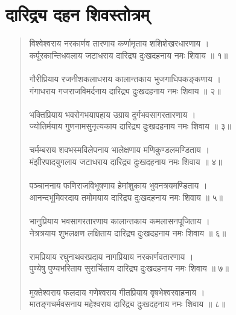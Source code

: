 \section{\sanskrit दारिद्र्य दहन शिवस्तोत्रम् }
\begin{quotation}\sanskrit
विश्वेश्वराय नरकार्णव तारणाय कर्णामृताय शशिशेखरधारणाय ।\\ 
कर्पूरकान्तिधवलाय जटाधराय दारिद्र्य दुःखदहनाय नमः शिवाय ॥ १॥\\ 
\\
गौरीप्रियाय रजनीशकलाधराय कालान्तकाय भुजगाधिपकङ्कणाय । \\
गंगाधराय गजराजविमर्दनाय दारिद्र्य दुःखदहनाय नमः शिवाय ॥ २॥ \\
\\
भक्तिप्रियाय भवरोगभयापहाय उग्राय दुर्गभवसागरतारणाय । \\
ज्योतिर्मयाय गुणनामसुनृत्यकाय दारिद्र्य दुःखदहनाय नमः शिवाय ॥ ३॥\\ 
\\
चर्मम्बराय शवभस्मविलेपनाय भालेक्षणाय मणिकुण्डलमण्डिताय । \\
मंझीरपादयुगलाय जटाधराय दारिद्र्य दुःखदहनाय नमः शिवाय ॥ ४॥ \\
\\
पञ्चाननाय फणिराजविभूषणाय हेमांशुकाय भुवनत्रयमण्डिताय । \\
आनन्दभूमिवरदाय तमोमयाय दारिद्र्य दुःखदहनाय नमः शिवाय ॥ ५॥\\ 
\\
भानुप्रियाय भवसागरतारणाय कालान्तकाय कमलासनपूजिताय । \\
नेत्रत्रयाय शुभलक्षण लक्षिताय दारिद्र्य दुःखदहनाय नमः शिवाय ॥ ६॥ \\
\\
रामप्रियाय रघुनाथवरप्रदाय नागप्रियाय नरकार्णवतारणाय । \\
पुण्येषु पुण्यभरिताय सुरार्चिताय दारिद्र्य दुःखदहनाय नमः शिवाय ॥ ७॥\\ 
\\
मुक्तेश्वराय फलदाय गणेश्वराय गीतप्रियाय वृषभेश्वरवाहनाय । \\
मातङ्गचर्मवसनाय महेश्वराय दारिद्र्य दुःखदहनाय नमः शिवाय ॥ ८॥\\
\end{quotation}



